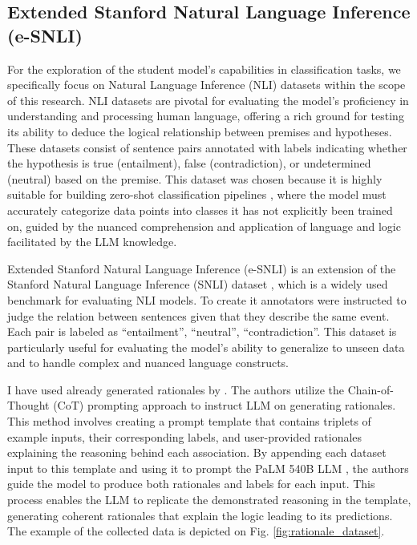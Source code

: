 \subsection{Extended Stanford Natural Language Inference (e-SNLI)}

For the exploration of the student model's capabilities in classification tasks, we specifically focus on Natural Language Inference (NLI) datasets within the scope of this research. NLI datasets are pivotal for evaluating the model's proficiency in understanding and processing human language, offering a rich ground for testing its ability to deduce the logical relationship between premises and hypotheses. These datasets consist of sentence pairs annotated with labels indicating whether the hypothesis is true (entailment), false (contradiction), or undetermined (neutral) based on the premise. This dataset was chosen because it is highly suitable for building zero-shot classification pipelines \cite{zeroshotclf}, where the model must accurately categorize data points into classes it has not explicitly been trained on, guided by the nuanced comprehension and application of language and logic facilitated by the LLM knowledge.

Extended Stanford Natural Language Inference (e-SNLI) \cite{esnli} is an extension of the Stanford Natural Language Inference (SNLI) dataset \cite{snli}, which is a widely used benchmark for evaluating NLI models. To create it annotators were instructed to judge the relation between sentences given that they describe the same event. Each pair is labeled as ``entailment'', ``neutral'', ``contradiction''. This dataset is particularly useful for evaluating the model's ability to generalize to unseen data and to handle complex and nuanced language constructs.

I have used already generated rationales by \citeauthor{stepbystep} \cite{stepbystep}. The authors utilize the Chain-of-Thought (CoT) \cite{cot} prompting approach to instruct LLM on generating rationales. This method involves creating a prompt template that contains triplets of example inputs, their corresponding labels, and user-provided rationales explaining the reasoning behind each association. By appending each dataset input to this template and using it to prompt the PaLM 540B LLM \cite{palm}, the authors guide the model to produce both rationales and labels for each input. This process enables the LLM to replicate the demonstrated reasoning in the template, generating coherent rationales that explain the logic leading to its predictions. The example of the collected data is depicted on Fig. \ref{fig:rationale_dataset}.

